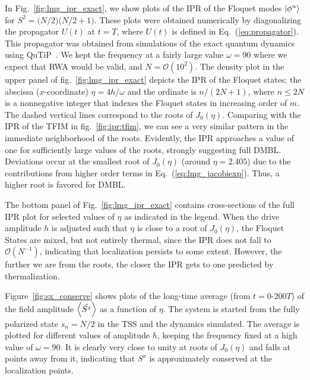 \documentclass[%
reprint,
superscriptaddress,
amsmath,amssymb,
aps,
prb,
showkeys,
]{revtex4-2}
\begin{document}
In Fig.~\ref{fig:lmg_ipr_exact}, we show plots of the IPR of the Floquet modes $\ket{\phi^n}$ for $S^2 = \big(N/2\big)\big(N/2 + 1\big)$.
These plots were obtained numerically by diagonalizing the propagator $U(t)$ at $t=T$, where $U(t)$ is defined in Eq.~(\ref{eq:propagator}). This propagator was obtained from simulations of the exact quantum dynamics using QuTiP~\cite{qutip}. We kept the frequency at a fairly large value $\omega = 90$ where we expect that RWA would be valid, and $N=\mathcal{O}(10^2)$. The density plot in the upper panel of fig.~\ref{fig:lmg_ipr_exact} depicts the IPR of the Floquet states; the abscissa ($x$-coordinate)  $\eta=4h/\omega$ and the ordinate is $n/(2N+1)$, where $n\leq 2N$ is a nonnegative integer that indexes the Floquet states in increasing order of $m$. The dashed vertical lines correspond to the roots of $J_0(\eta)$. Comparing with the IPR of the TFIM in fig.~\ref{fig:ipr:tfim}, we can see a very similar pattern in the immediate neighborhood of the roots. Evidently, the IPR approaches a value of one for sufficiently large values of the roots, strongly suggesting full DMBL. Deviations occur at the smallest root of $J_0(\eta)$ (around $\eta = 2.405$) due to the contributions from higher order terms in Eq.~(\ref{eq:lmg_jacobiexp}). Thus, a higher root is favored for DMBL.

The bottom panel of Fig.~\ref{fig:lmg_ipr_exact} contains cross-sections of the full IPR plot for selected values of $\eta$ as indicated in the legend. When the drive amplitude $h$ is adjusted such that $\eta$ is close to a root of $J_0(\eta)$, the Floquet States are mixed, but not entirely thermal, since the IPR does not fall to $\mathcal{O}(N^{-1})$, indicating that localization persists to some extent. However, the further we are from the roots, the closer the IPR gets to one predicted by thermalization.

Figure~\ref{fig:sx_conserve} shows plots of the long-time average (from $t=0$-$200T$) of the field amplitude $\expval{\hat{S^x}}$ as a function of $\eta$. The system is started from the fully polarized state $s_n=N/2$ in the TSS and the dynamics simulated. The average is plotted for different values of amplitude $h$, keeping the frequency fixed at a high value of $\omega=90$. It is clearly very close to unity at roots of $J_0(\eta)$ and falls at points away from it, indicating that $S^x$ is approximately conserved at the localization points.
\end{document}
